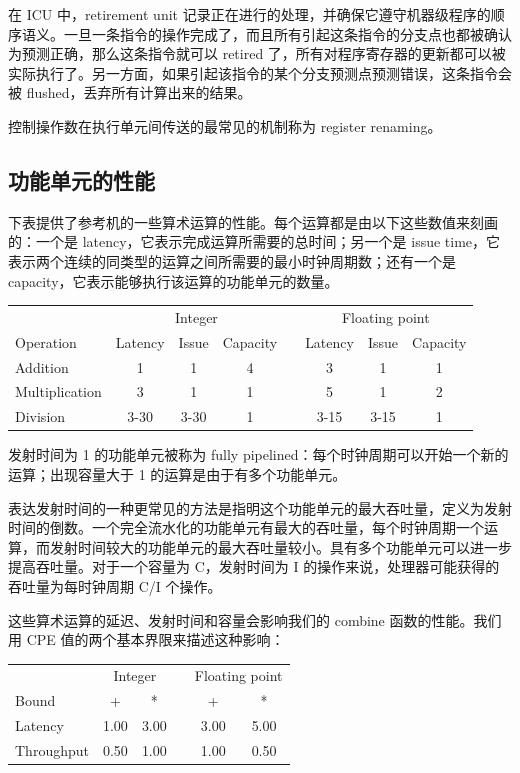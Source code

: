 在 ICU 中，retirement unit 记录正在进行的处理，并确保它遵守机器级程序的顺序语义。一旦一条指令的操作完成了，而且所有引起这条指令的分支点也都被确认为预测正确，那么这条指令就可以 retired 了，所有对程序寄存器的更新都可以被实际执行了。另一方面，如果引起该指令的某个分支预测点预测错误，这条指令会被 flushed，丢弃所有计算出来的结果。

控制操作数在执行单元间传送的最常见的机制称为 register renaming。

\subsection{功能单元的性能}

下表提供了参考机的一些算术运算的性能。每个运算都是由以下这些数值来刻画的：一个是 latency，它表示完成运算所需要的总时间；另一个是 issue time，它表示两个连续的同类型的运算之间所需要的最小时钟周期数；还有一个是 capacity，它表示能够执行该运算的功能单元的数量。

\begin{table}[!ht]
    \centering
    \begin{tabular}{lccccccc}
        \toprule
        & \multicolumn{3}{c}{Integer} & & \multicolumn{3}{c}{Floating point} \\
        \cmidrule{2-4} \cmidrule{6-8}
        Operation & Latency & Issue & Capacity & & Latency & Issue & Capacity \\
        \midrule
        Addition & 1 & 1 & 4 & & 3 & 1 & 1 \\
        Multiplication & 3 & 1 & 1 & & 5 & 1 & 2 \\
        Division & 3-30 & 3-30 & 1 & & 3-15 & 3-15 & 1 \\
        \bottomrule
    \end{tabular}
\end{table}

发射时间为 1 的功能单元被称为 fully pipelined：每个时钟周期可以开始一个新的运算；出现容量大于 1 的运算是由于有多个功能单元。

表达发射时间的一种更常见的方法是指明这个功能单元的最大吞吐量，定义为发射时间的倒数。一个完全流水化的功能单元有最大的吞吐量，每个时钟周期一个运算，而发射时间较大的功能单元的最大吞吐量较小。具有多个功能单元可以进一步提高吞吐量。对于一个容量为 C，发射时间为 I 的操作来说，处理器可能获得的吞吐量为每时钟周期 C/I 个操作。

这些算术运算的延迟、发射时间和容量会影响我们的 combine 函数的性能。我们用 CPE 值的两个基本界限来描述这种影响：

\begin{table}[!ht]
    \centering
    \begin{tabular}{lccccc}
        \toprule
        & \multicolumn{2}{c}{Integer} & & \multicolumn{2}{c}{Floating point} \\
        \cmidrule{2-3} \cmidrule{5-6}
        Bound & + & * & & + & * \\
        \midrule
        Latency & 1.00 & 3.00 & & 3.00 & 5.00 \\
        Throughput & 0.50 & 1.00 & & 1.00 & 0.50 \\
        \bottomrule
    \end{tabular}
\end{table}

